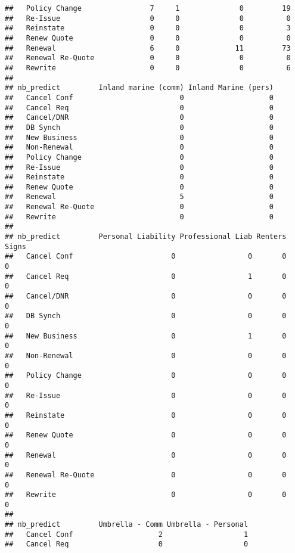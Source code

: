 \documentclass[]{article}
\begin{document}
\begin{verbatim}
##   Policy Change                7     1              0         19
##   Re-Issue                     0     0              0          0
##   Reinstate                    0     0              0          3
##   Renew Quote                  0     0              0          0
##   Renewal                      6     0             11         73
##   Renewal Re-Quote             0     0              0          0
##   Rewrite                      0     0              0          6
##                   
## nb_predict         Inland marine (comm) Inland Marine (pers)
##   Cancel Conf                         0                    0
##   Cancel Req                          0                    0
##   Cancel/DNR                          0                    0
##   DB Synch                            0                    0
##   New Business                        0                    0
##   Non-Renewal                         0                    0
##   Policy Change                       0                    0
##   Re-Issue                            0                    0
##   Reinstate                           0                    0
##   Renew Quote                         0                    0
##   Renewal                             5                    0
##   Renewal Re-Quote                    0                    0
##   Rewrite                             0                    0
##                   
## nb_predict         Personal Liability Professional Liab Renters Signs
##   Cancel Conf                       0                 0       0     0
##   Cancel Req                        0                 1       0     0
##   Cancel/DNR                        0                 0       0     0
##   DB Synch                          0                 0       0     0
##   New Business                      0                 1       0     0
##   Non-Renewal                       0                 0       0     0
##   Policy Change                     0                 0       0     0
##   Re-Issue                          0                 0       0     0
##   Reinstate                         0                 0       0     0
##   Renew Quote                       0                 0       0     0
##   Renewal                           0                 0       0     0
##   Renewal Re-Quote                  0                 0       0     0
##   Rewrite                           0                 0       0     0
##                   
## nb_predict         Umbrella - Comm Umbrella - Personal
##   Cancel Conf                    2                   1
##   Cancel Req                     0                   0

\end{verbatim}
\end{document}
